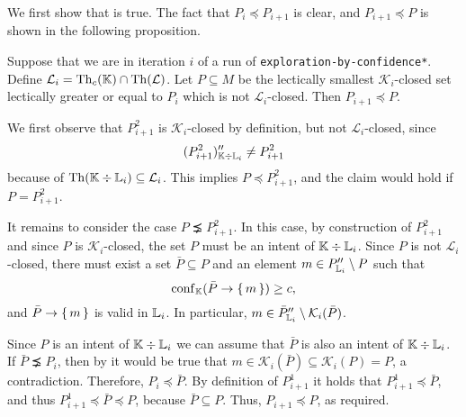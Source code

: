 We first show that  is true.  The fact that $P_{i} \preceq P_{i+1}$ is clear,
and $P_{i+1} \preceq P$ is shown in the following proposition.
\begin{Proposition}
  \label{prop:exploration-by-confidence-first-condition-holds}
  Suppose that we are in iteration $i$ of a run of \lstinline{exploration-by-confidence*}.
  Define $\mathcal{L}_{i} = \operatorname{Th}_{c}({\mathbb{K}}) \cap \operatorname{Th}(\mathcal{L})$.  Let $P \subseteq M$
  be the lectically smallest $\mathcal{K}_{i}$-closed set lectically greater or equal to
  $P_{i}$ which is not $\mathcal{L}_{i}$-closed.  Then $P_{i+1} \preceq P$.
\end{Proposition}
\begin{Proof}
  We first observe that $P_{i+1}^{2}$ is $\mathcal{K}_{i}$-closed by definition, but not
  $\mathcal{L}_{i}$-closed, since
  \begin{equation*}
    (P_{i+1}^{2})_{{\mathbb{K}} \div {\ensuremath{\mathbb{L}}}_{i}}'' \neq P_{i+1}^{2}
  \end{equation*}
  because of $\operatorname{Th}({\mathbb{K}} \div {\ensuremath{\mathbb{L}}}_{i}) \subseteq \mathcal{L}_{i}$.  This implies $P
  \preceq P_{i+1}^{2}$, and the claim would hold if $P = P_{i+1}^{2}$.

  It remains to consider the case $P \precneq P_{i+1}^{2}$.  In this case, by construction
  of $P_{i+1}^{2}$ and since $P$ is $\mathcal{K}_{i}$-closed, the set $P$ must be an
  intent of ${\mathbb{K}} \div {\ensuremath{\mathbb{L}}}_{i}$.  Since $P$ is not $\mathcal{L}_{i}$-closed, there
  must exist a set $\bar P \subseteq P$ and an element $m \in P_{{\mathbb{L}}_{i}}'' \setminus
  P$ such that
  \begin{equation*}
    \operatorname{conf}_{{\mathbb{K}}}(\bar P \to {\ensuremath{\{\,m\,\}}}) \ge c,
  \end{equation*}
  and $\bar P \to {\ensuremath{\{\,m\,\}}}$ is valid in ${\mathbb{L}}_{i}$.  In particular, $m \in \bar P_{{\mathbb{L}}_{i}}'' \setminus \mathcal{K}_{i}(\bar P)$.
  
  Since $P$ is an intent of ${\mathbb{K}} \div {\ensuremath{\mathbb{L}}}_{i}$ we can assume that $\bar P$ is also
  an intent of ${\mathbb{K}} \div {\ensuremath{\mathbb{L}}}_{i}$.  If $\bar P \precneq P_{i}$, then by
   it would be true that $m
  \in \mathcal{K}_{i}(\bar P) \subseteq \mathcal{K}_{i}(P) = P$, a contradiction.
  Therefore, $P_{i} \preceq \bar P$.  By definition of $P_{i+1}^{1}$ it holds that
  $P_{i+1}^{1} \preceq \bar P$, and thus $P_{i+1}^{1} \preceq \bar P \preceq P$, because
  $\bar P \subseteq P$.  Thus, $P_{i+1} \preceq P$, as required.
\end{Proof}

